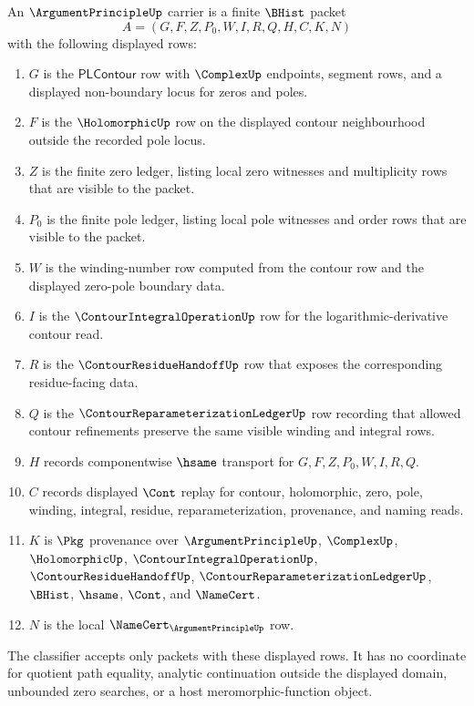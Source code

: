 \begin{definition}
\label{def:argument-principle-carrier}
An $\ArgumentPrincipleUp$ carrier is a finite $\BHist$ packet
$$
A=(G,F,Z,P_0,W,I,R,Q,H,C,K,N)
$$
with the following displayed rows:
\begin{enumerate}
\item $G$ is the $\mathsf{PLContour}$ row with $\ComplexUp$ endpoints, segment rows, and a displayed non-boundary locus for zeros and poles.
\item $F$ is the $\HolomorphicUp$ row on the displayed contour neighbourhood outside the recorded pole locus.
\item $Z$ is the finite zero ledger, listing local zero witnesses and multiplicity rows that are visible to the packet.
\item $P_0$ is the finite pole ledger, listing local pole witnesses and order rows that are visible to the packet.
\item $W$ is the winding-number row computed from the contour row and the displayed zero-pole boundary data.
\item $I$ is the $\ContourIntegralOperationUp$ row for the logarithmic-derivative contour read.
\item $R$ is the $\ContourResidueHandoffUp$ row that exposes the corresponding residue-facing data.
\item $Q$ is the $\ContourReparameterizationLedgerUp$ row recording that allowed contour refinements preserve the same visible winding and integral rows.
\item $H$ records componentwise $\hsame$ transport for $G,F,Z,P_0,W,I,R,Q$.
\item $C$ records displayed $\Cont$ replay for contour, holomorphic, zero, pole, winding, integral, residue, reparameterization, provenance, and naming reads.
\item $K$ is $\Pkg$ provenance over $\ArgumentPrincipleUp$, $\ComplexUp$, $\HolomorphicUp$, $\ContourIntegralOperationUp$, $\ContourResidueHandoffUp$, $\ContourReparameterizationLedgerUp$, $\BHist$, $\hsame$, $\Cont$, and $\NameCert$.
\item $N$ is the local $\NameCert_{\ArgumentPrincipleUp}$ row.
\end{enumerate}
The classifier accepts only packets with these displayed rows. It has no coordinate for quotient path equality, analytic continuation outside the displayed domain, unbounded zero searches, or a host meromorphic-function object.
\end{definition}


